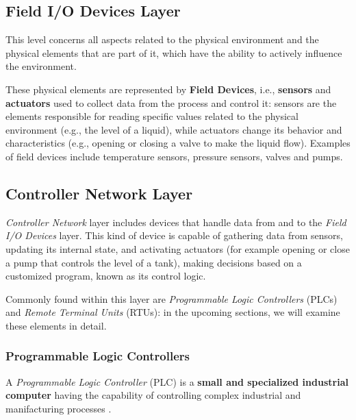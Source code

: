 
\subsection{Field I/O Devices Layer}
\label{subsec:2_ot_field_io_devs}

This level concerns all aspects related to the physical environment and the physical elements that are part of it, which have the ability to actively influence the environment.
 
These physical elements are represented by \textbf{Field Devices}, i.e., \textbf{sensors} and \textbf{actuators} used to collect data from the process and control it: sensors are the elements responsible for reading specific values related to the physical environment (e.g., the level of a liquid), while actuators change its behavior and characteristics (e.g., opening or closing a valve to make the liquid flow). Examples of field devices include temperature sensors, pressure sensors, valves and pumps.

\subsection{Controller Network Layer}
\label{subsec:2_ot_controller_network}
\textit{Controller Network} layer includes devices that handle data from and
to the \textit{Field I/O Devices} layer. This kind of device is capable of gathering data from sensors, updating its internal state, and activating actuators (for example opening or close a pump that controls the level of a tank), making decisions based on a customized program, known as its control logic.

Commonly found within this layer are \textit{Programmable Logic Controllers} (PLCs) and \textit{Remote Terminal Units} (RTUs): in the upcoming sections, we will examine these elements in detail.

\subsubsection{Programmable Logic Controllers}
\label{subsubsec:2_plc}
A \textit{Programmable Logic Controller} (PLC) is a \textbf{small and specialized industrial computer} having the capability of controlling complex industrial and manifacturing processes \cite{plc_definition}.

